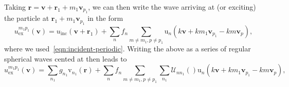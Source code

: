 \documentclass[ 12pt, a4paper]{article}
\renewcommand{\vec}[1]{\boldsymbol{#1}}
\begin{document}
Taking $\vec r = \vec v + \vec r_1 + m_1 \vec v_{p_1}$, we can then write the wave arriving at (or exciting) the particle at $\vec r_1 + m_1 \vec v_{p_1}$ in the form
\[
u^{m_1 p_1}_\mathrm{ex}(\vec v) = u_\mathrm{inc}(\vec v + \vec r_1) + \sum_n f_n \sum_{m \not = m_1, p \not = p_1} \mathrm u_n(k \vec v + k m_1 \vec v_{p_1} - k m \vec v_p),
\]
where we used~\eqref{eqn:incident-periodic}. Writing the above as a series of regular spherical waves cented at  then leads to
\[
u^{m_1 p_1}_\mathrm{ex}(\vec v) = \sum_{n_1} g_{n_1} \mathrm v_{n_1}(\vec r) + \sum_n f_n \sum_{m \not = m_1, p \not = p_1} \sum_{n_1} \mathcal U_{n n_1}() \mathrm u_n(k \vec v + k m_1 \vec v_{p_1} - k m \vec v_p),
\]
\printbibliography
\end{document}
